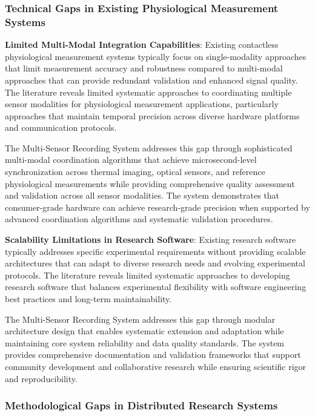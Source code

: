 \documentclass[11pt,a4paper]{report}
\begin{document}
\subsubsection{Technical Gaps in Existing Physiological Measurement Systems}

\textbf{Limited Multi-Modal Integration Capabilities}: Existing contactless physiological measurement systems typically focus
on single-modality approaches that limit measurement accuracy and robustness compared to multi-modal approaches that can
provide redundant validation and enhanced signal quality. The literature reveals limited systematic approaches to
coordinating multiple sensor modalities for physiological measurement applications, particularly approaches that
maintain temporal precision across diverse hardware platforms and communication protocols.

The Multi-Sensor Recording System addresses this gap through sophisticated multi-modal coordination algorithms that
achieve microsecond-level synchronization across thermal imaging, optical sensors, and reference physiological
measurements while providing comprehensive quality assessment and validation across all sensor modalities. The system
demonstrates that consumer-grade hardware can achieve research-grade precision when supported by advanced coordination
algorithms and systematic validation procedures.

\textbf{Scalability Limitations in Research Software}: Existing research software typically addresses specific experimental
requirements without providing scalable architectures that can adapt to diverse research needs and evolving experimental
protocols. The literature reveals limited systematic approaches to developing research software that balances
experimental flexibility with software engineering best practices and long-term maintainability.

The Multi-Sensor Recording System addresses this gap through modular architecture design that enables systematic
extension and adaptation while maintaining core system reliability and data quality standards. The system provides
comprehensive documentation and validation frameworks that support community development and collaborative research
while ensuring scientific rigor and reproducibility.

\subsubsection{Methodological Gaps in Distributed Research Systems}
\end{document}
